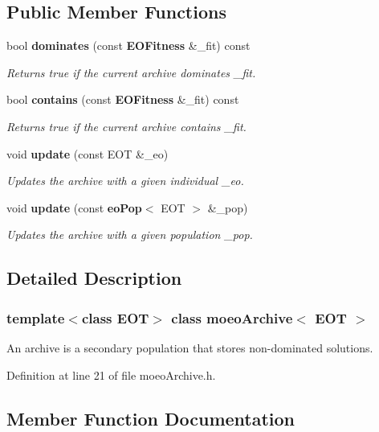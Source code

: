 \subsection*{Public Member Functions}
\begin{CompactItemize}
\item 
bool {\bf dominates} (const {\bf EOFitness} \&\_\-fit) const
\begin{CompactList}\small\item\em Returns true if the current archive dominates \_\-fit. \item\end{CompactList}\item 
bool {\bf contains} (const {\bf EOFitness} \&\_\-fit) const
\begin{CompactList}\small\item\em Returns true if the current archive contains \_\-fit. \item\end{CompactList}\item 
void {\bf update} (const EOT \&\_\-eo)
\begin{CompactList}\small\item\em Updates the archive with a given individual \_\-eo. \item\end{CompactList}\item 
void {\bf update} (const {\bf eo\-Pop}$<$ EOT $>$ \&\_\-pop)
\begin{CompactList}\small\item\em Updates the archive with a given population \_\-pop. \item\end{CompactList}\end{CompactItemize}


\subsection{Detailed Description}
\subsubsection*{template$<$class EOT$>$ class moeo\-Archive$<$ EOT $>$}

An archive is a secondary population that stores non-dominated solutions. 



Definition at line 21 of file moeo\-Archive.h.

\subsection{Member Function Documentation}
